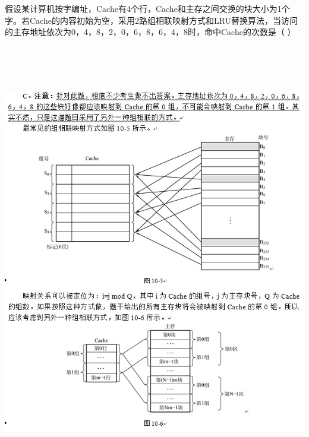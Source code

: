 \question 假设某计算机按字编址，Cache有4个行，Cache和主存之间交换的块大小为1个字。若Cache的内容初始为空，采用2路组相联映射方式和LRU替换算法，当访问的主存地址依次为0，4，8，2，0，6，8，6，4，8时，命中Cache的次数是（
）
\par{}
\begin{solution}\includegraphics[width=6.61458in,height=7.55208in]{computerassets/ff0c95e262008e1450dfd6e70ac0cf03.jpeg}

\end{solution}
